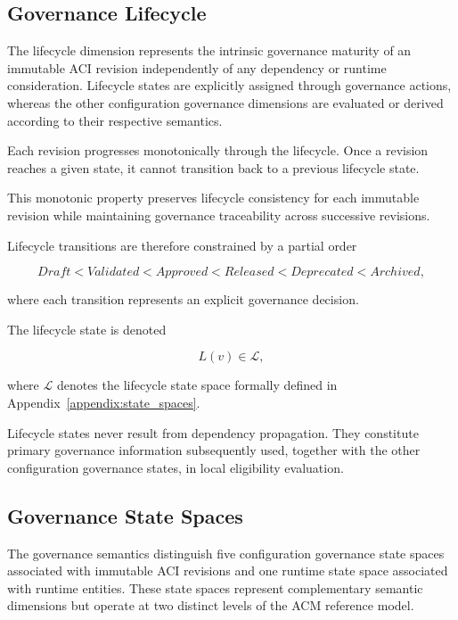 \documentclass[10pt]{article}
\begin{document}
\subsection{Governance Lifecycle}
\label{sec:lifecycle_semantics}

The lifecycle dimension represents the intrinsic governance maturity of an immutable ACI revision independently of any dependency or runtime consideration. Lifecycle states are explicitly assigned through governance actions, whereas the other configuration governance dimensions are evaluated or derived according to their respective semantics.

Each revision progresses monotonically through the lifecycle. Once a revision reaches a given state, it cannot transition back to a previous lifecycle state.

This monotonic property preserves lifecycle consistency for each immutable revision while maintaining governance traceability across successive revisions.

Lifecycle transitions are therefore constrained by a partial order

\begin{equation}
	Draft
	<
	Validated
	<
	Approved
	<
	Released
	<
	Deprecated
	<
	Archived,
	\label{eq:lifecycle_order}
\end{equation}

where each transition represents an explicit governance decision.

The lifecycle state is denoted

\begin{equation}
	L(v)\in\mathcal{L},
	\label{eq:lifecycle_state}
\end{equation}

where $\mathcal{L}$ denotes the lifecycle state space formally defined in Appendix~\ref{appendix:state_spaces}.

Lifecycle states never result from dependency propagation. They constitute primary governance information subsequently used, together with the other configuration governance states, in local eligibility evaluation.

\subsection{Governance State Spaces}
\label{sec:governance_state_spaces}

The governance semantics distinguish five configuration governance state spaces associated with immutable ACI revisions and one runtime state space associated with runtime entities. These state spaces represent complementary semantic dimensions but operate at two distinct levels of the ACM reference model.
\end{document}
